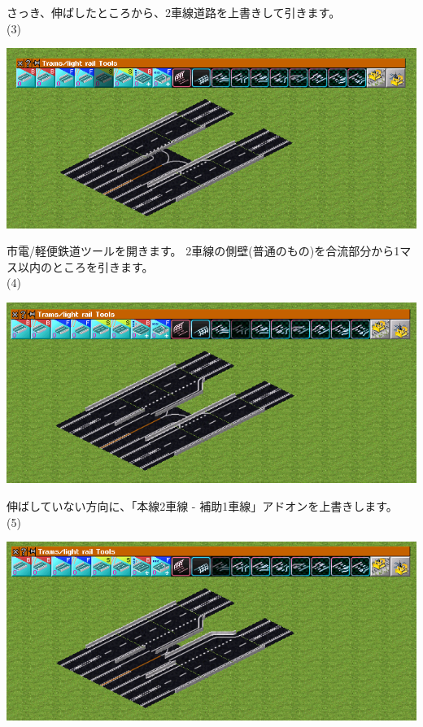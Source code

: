 \documentclass{jbook}
\begin{document}
  さっき、伸ばしたところから、2車線道路を上書きして引きます。
  \\


  (3)

  \includegraphics[width = 135mm]{picture/20210214-road-1-4.png}

  市電/軽便鉄道ツールを開きます。
  2車線の側壁(普通のもの)を合流部分から1マス以内のところを引きます。
  \\

  (4)

  \includegraphics[width = 135mm]{picture/20210214-road-1-5.png}

  伸ばしていない方向に、「本線2車線 - 補助1車線」アドオンを上書きします。
  \\

\newpage
  (5)

  \includegraphics[width = 135mm]{picture/20210214-road-1-6.png}
\end{document}
